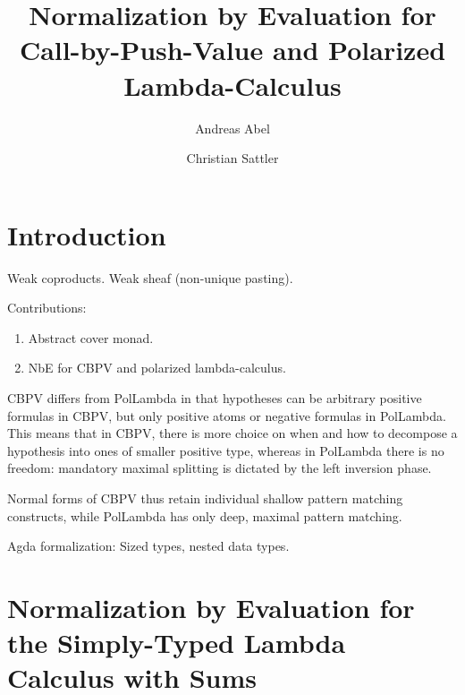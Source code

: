 \documentclass[a4paper,USenglish,cleveref, autoref]{lipics-v2019}
\title{Normalization by Evaluation for Call-by-Push-Value and Polarized Lambda-Calculus}
\author{Andreas Abel}
  {Department of Computer Science and Engineering,
    Chalmers and Gothenburg University,
    Sweden \and
    \url{www.cse.chalmers.se/~abela}
  }
  {andreas.abel@gu.se}
  {https://orcid.org/0000-0003-0420-4492}
  {VR Grant 2014-04864 \emph{Termination
      Certificates for Dependently-Typed Programs and Proofs via
      Refinement Types}
  }
\author{Christian Sattler}
  {Department of Computer Science and Engineering,
    Chalmers and Gothenburg University,
    Sweden
  }
  {}%
  {}%
  {}%
\begin{document}
\maketitle

\begin{abstract}

\end{abstract}


\section{Introduction}
\label{sec:intro}

Weak coproducts.
Weak sheaf (non-unique pasting).

Contributions:
\begin{enumerate}
\item Abstract cover monad.
\item NbE for CBPV and polarized lambda-calculus.
\end{enumerate}

CBPV differs from PolLambda in that hypotheses can be arbitrary
positive formulas in CBPV, but only positive atoms or negative
formulas in PolLambda.  This means that in CBPV, there is more choice
on when and how to decompose a hypothesis into ones of smaller
positive type, whereas in PolLambda there is no freedom: mandatory
maximal splitting is dictated by the left inversion phase.

Normal forms of CBPV thus retain individual shallow pattern matching
constructs, while PolLambda has only deep, maximal pattern matching.

Agda formalization:
Sized types, nested data types.

\nocite{bergerSchwichtenberg:lics91}

\nocite{jungTiuryn:tlca93}

\nocite{altenkirchHofmannStreicher:ctcs95}

\nocite{abel:habil}

\nocite{danvy:popl96}

\nocite{fioreSimpson:tlca99}

\nocite{altenkirchDybjerHofmannScott:lics01}

\nocite{balatDiCosmoFiore:popl04}

\nocite{altenkirchUustalu:flops04}

\nocite{barral:PhD}

\nocite{scherer:popl17}


\section{Normalization by Evaluation for the Simply-Typed Lambda
  Calculus with Sums}
\label{sec:lambda}
\end{document}
